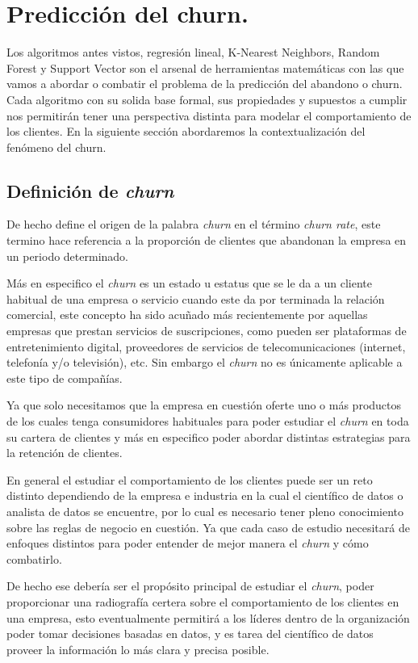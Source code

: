 \section{Predicción del churn.}

Los algoritmos antes vistos, regresión lineal, K-Nearest Neighbors, Random Forest y Support Vector son el arsenal de herramientas matemáticas con las que vamos a abordar o combatir el problema de la predicción del abandono o churn. Cada algoritmo con su solida base formal, sus propiedades y supuestos a cumplir nos permitirán tener una perspectiva distinta para modelar el comportamiento de los clientes. En la siguiente sección abordaremos la contextualización del fenómeno del churn.  

\subsection{Definición de \textit{churn}}

De hecho \citet[p. 36]{2020Gold} define el origen de la palabra \textit{churn} en el término \textit{churn rate}, este termino hace referencia a la proporción de clientes que abandonan la empresa en un periodo determinado. 

Más en especifico el \textit{churn} es un estado u estatus que se le da a un cliente habitual de una empresa o servicio cuando este da por terminada la relación comercial, este concepto ha sido acuñado más recientemente por aquellas empresas que prestan servicios de suscripciones, como pueden ser plataformas de entretenimiento digital, proveedores de servicios de telecomunicaciones (internet, telefonía y/o televisión), etc. Sin embargo el \textit{churn} no es únicamente aplicable a este tipo de compañías.

Ya que solo necesitamos que la empresa en cuestión oferte uno o más productos de los cuales tenga consumidores habituales para poder estudiar el \textit{churn} en toda su cartera de clientes y más en especifico poder abordar distintas estrategias para la retención de clientes. 

En general el estudiar el comportamiento de los clientes puede ser un reto distinto dependiendo de la empresa e industria en la cual el científico de datos o analista de datos se encuentre, por lo cual es necesario tener pleno conocimiento sobre las reglas de negocio en cuestión. Ya que cada caso de estudio necesitará de enfoques distintos para poder entender de mejor manera el \textit{churn} y cómo combatirlo.

De hecho ese debería ser el propósito principal de estudiar el \textit{churn}, poder proporcionar una radiografía certera sobre el comportamiento de los clientes en una empresa, esto eventualmente permitirá a los líderes dentro de la organización poder tomar decisiones basadas en datos, y es tarea del científico de datos proveer la información lo más clara y precisa posible.


